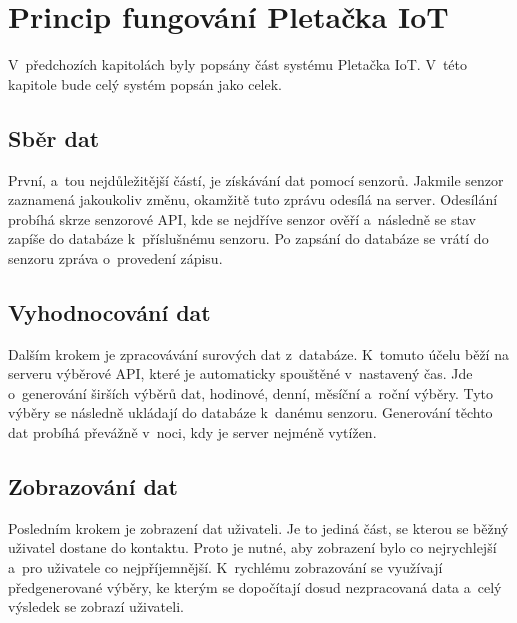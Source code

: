 \chapter{Princip fungování Pletačka IoT}
V~předchozích kapitolách byly popsány část systému Pletačka IoT.
V~této kapitole bude celý systém popsán jako celek.


\section{Sběr dat}
První, a~tou nejdůležitější částí, je získávání dat pomocí senzorů.
Jakmile senzor zaznamená jakoukoliv změnu, okamžitě tuto zprávu odesílá na server.
Odesílání probíhá skrze senzorové API, kde se nejdříve senzor ověří a~následně se stav zapíše do databáze k~příslušnému senzoru.
Po zapsání do databáze se vrátí do senzoru zpráva o~provedení zápisu. 


\section{Vyhodnocování dat}
Dalším krokem je zpracovávání surových dat z~databáze.
K~tomuto účelu běží na serveru výběrové API, které je automaticky spouštěné v~nastavený čas.
Jde o~generování širších výběrů dat, hodinové, denní, měsíční a~roční výběry.
Tyto výběry se následně ukládají do databáze k~danému senzoru.
Generování těchto dat probíhá převážně v~noci, kdy je server nejméně vytížen.


\section{Zobrazování dat}
Posledním krokem je zobrazení dat uživateli.
Je to jediná část, se kterou se běžný uživatel dostane do kontaktu.
Proto je nutné, aby zobrazení bylo co nejrychlejší a~pro uživatele co nejpříjemnější.
K~rychlému zobrazování se využívají předgenerované výběry, ke kterým se dopočítají dosud nezpracovaná data a~celý výsledek se zobrazí uživateli.





